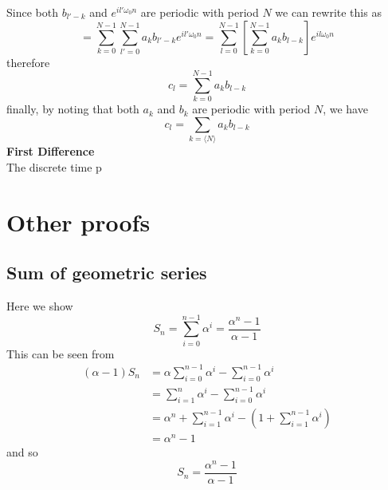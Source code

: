 \documentclass{report}
\begin{document}
Since both $b_{l'-k}$ and $e^{il'\omega_0n}$ are periodic with period $N$ we can rewrite this as
\begin{equation*}
=\sum^{N-1}_{k=0}\sum^{N-1}_{l'=0}a_kb_{l'-k}e^{il'\omega_0n}=\sum^{N-1}_{l=0}\left[\sum^{N-1}_{k=0}a_kb_{l-k}\right]e^{il\omega_0n}
\end{equation*}
therefore
\begin{equation*}
c_l=\sum^{N-1}_{k=0}a_kb_{l-k}
\end{equation*}
finally, by noting that both $a_k$ and $b_k$ are periodic with period $N$, we have
\begin{equation*}
c_l=\sum_{k=\langle N\rangle}a_kb_{l-k}
\end{equation*}
\textbf{First Difference}\\
The discrete time p







\appendix
\chapter{Other proofs}
\section{Sum of geometric series}
Here we show
\begin{equation*}
S_n=\sum^{n-1}_{i=0}\alpha^i=\frac{\alpha^n-1}{\alpha-1}
\end{equation*}
This can be seen from
\begin{align*}
(\alpha-1)S_n&=\alpha\sum^{n-1}_{i=0}\alpha^i-\sum^{n-1}_{i=0}\alpha^i\\
&=\sum^{n}_{i=1}\alpha^i-\sum^{n-1}_{i=0}\alpha^i\\
&=\alpha^n+\sum^{n-1}_{i=1}\alpha^i-(1+\sum^{n-1}_{i=1}\alpha^i)\\
&=\alpha^n-1
\end{align*}
and so
\begin{equation*}
S_n=\frac{\alpha^n-1}{\alpha-1}
\end{equation*}
\end{document}
